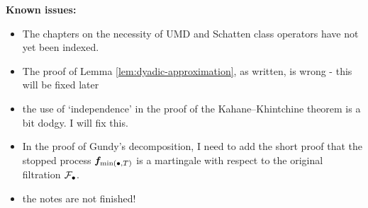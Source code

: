 \textbf{Known issues:}
\begin{itemize}
\item The chapters on the necessity of UMD and Schatten class operators have not yet been indexed.
\item The proof of Lemma \ref{lem:dyadic-approximation}, as written, is wrong - this will be fixed later
\item the use of `independence' in the proof of the Kahane--Khintchine theorem is a bit dodgy. I will fix this.
\item In the proof of Gundy's decomposition, I need to add the short proof that the stopped process $\bm{f}_{\min(\bullet, T)}$ is a martingale with respect to the original filtration $\mathcal{F}_{\bullet}$.
\item the notes are not finished!
\end{itemize}

  





